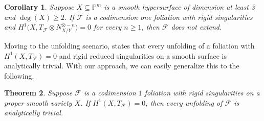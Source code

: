 \documentclass[reqno]{amsart}
\theoremstyle{plain}
\renewcommand\P{\mathbb{P}}
\newcommand{\F}{\mathscr{F}}
\newcounter{Theorem}
\newtheorem{theorem}{Theorem}[section]
\newtheorem{corollary}[theorem]{Corollary}
\theoremstyle{definition}
\theoremstyle{named}
\begin{document}
\begin{corollary}
Suppose $X\subseteq \P^{m}$ is a smooth hypersurface of dimension at least 3 and $\deg(X)\geqslant 2$. If $\F$ is a codimension one foliation with rigid singularities and $H^1\big(X,T_\F\otimes N_{X/Y}^{\otimes -n}\big) = 0$ for every $n\geqslant 1$, then $\F$ does not extend.
\end{corollary}

Moving to the unfolding scenario, \cite[Theorem 5.5]{gomez1989unfoldings} states that every unfolding of a foliation with $H^1(X,T_\F)= 0$ and rigid reduced singularities on a smooth surface is analytically trivial. With our approach, we can easily generalize this to the following.

\begin{theorem} \label{unf:trivial}
Suppose $\F$ is a codimension $1$ foliation with rigid singularities on a proper smooth variety $X$. If $H^1(X,T_\F) = 0$, then every unfolding of $\F$ is analytically trivial. 
\end{theorem}
\end{document}
